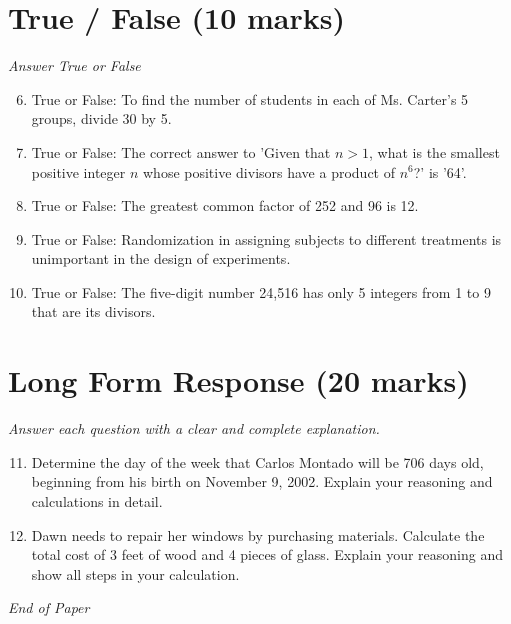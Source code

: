 \documentclass[12pt]{article}
\begin{document}
\section*{True / False (10 marks)}
\textit{Answer True or False}
\begin{enumerate}[label=\arabic*.]
\setcounter{enumi}{5}
\item True or False: To find the number of students in each of Ms. Carter's 5 groups, divide 30 by 5.
\item True or False: The correct answer to 'Given that $n > 1$, what is the smallest positive integer $n$ whose positive divisors have a product of $n^6$?' is '64'.
\item True or False: The greatest common factor of 252 and 96 is 12.
\item True or False: Randomization in assigning subjects to different treatments is unimportant in the design of experiments.
\item True or False: The five-digit number 24,516 has only 5 integers from 1 to 9 that are its divisors.
\end{enumerate}

\section*{Long Form Response (20 marks)}
\textit{Answer each question with a clear and complete explanation.}
\begin{enumerate}[label=\arabic*.]
\setcounter{enumi}{10}
\item Determine the day of the week that Carlos Montado will be 706 days old, beginning from his birth on November 9, 2002. Explain your reasoning and calculations in detail.
\item Dawn needs to repair her windows by purchasing materials. Calculate the total cost of 3 feet of wood and 4 pieces of glass. Explain your reasoning and show all steps in your calculation.
\end{enumerate}

\vfill
\noindent\textit{End of Paper}
\end{document}

